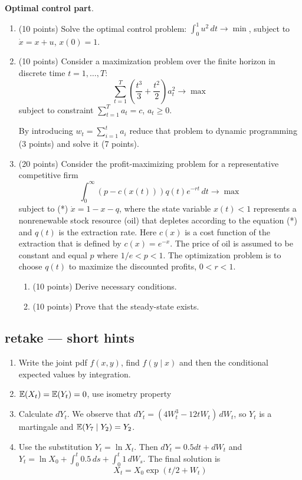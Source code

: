 \documentclass[pdftex,12pt,a4paper]{article}
\begin{document}
\vspace{20pt}

\textbf{Optimal control part}.  

\vspace{20pt}

\begin{enumerate}[resume]
\item (10 points) Solve the optimal control problem: $\int_0^1 u^2 \, dt \to \min$, subject to $\dot{x}=x+u$, $x(0)=1$. %
\item (10 points) Consider a maximization problem over the finite horizon in discrete time $t=1,\ldots,T$:
\[
\sum_{t=1}^{T} \left(\frac{t^3}{3}+\frac{t^2}{2}\right)a_t^2 \to \max
\] 
subject to constraint $\sum_{t=1}^T a_t=c$, $a_t \geq 0$.  

By introducing $w_t=\sum_{i=1}^t a_i$  reduce that problem to dynamic programming (3 points) and solve it (7 points).  

\item (20 points) Consider the profit-maximizing problem for a representative competitive firm 
\[
\int_0^{\infty} (p-c(x(t)))q(t)e^{-rt} \, dt \to \max
\]
subject to (*) $\dot{x}=1-x-q$, where the state variable  $x(t)<1$ represents a nonrenewable stock resource (oil) that depletes according to the equation (*) and $q(t)$ is the extraction rate. Here $c(x)$ is a cost function of the extraction that is defined by $c(x)=e^{-x}$. The price of oil is assumed to be constant and equal $p$ where $1/e<p<1$.  The optimization problem is to choose $q(t)$ to maximize the discounted profits, $0<r<1$.
\begin{enumerate}
\item (10 points) Derive necessary conditions.
\item (10 points) Prove that the steady-state exists.
\end{enumerate}
\end{enumerate}

\subsection{retake --- short hints}
\begin{enumerate}
\item Write the joint pdf $f(x,y)$, find $f(y \mid x)$ and then the conditional expected values by integration.
\item $\mathbb{E}(X_t)=\mathbb{E}(Y_t)=0$, use isometry property
\item Calculate  $dY_t$. We observe that $dY_t=(4W_t^3 - 12t W_t) \, dW_t$, so $Y_t$ is a martingale and $\mathbb{E}(Y_7 \mid Y_2)=Y_2$.
\item Use the substitution $Y_t=\ln X_t$. Then $dY_t= 0.5 dt + dW_t$ and $Y_t=\ln X_0 + \int_0^t 0.5 \, ds + \int_0^t 1 \, dW_s$. The final solution is 
\[
X_t=X_0\exp(t/2+W_t)
\]
\end{enumerate}
\end{document}
